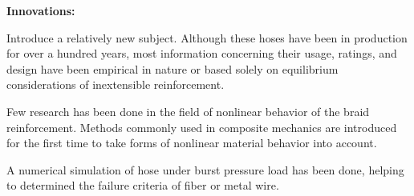 \begin{englishabstract}
\textbf{Innovations:}
\begin{compactenum}
	\item Introduce a relatively new subject. Although these hoses have been in production for over a hundred years, most information concerning their usage, ratings, and design have been empirical in nature or based solely on equilibrium considerations of inextensible reinforcement.
	\item Few research has been done in the field of nonlinear behavior of the braid reinforcement. Methods commonly used in composite mechanics are introduced for the first time to take  forms of nonlinear material behavior into account.
	\item A numerical simulation of hose under burst pressure load has been done,  helping to determined the failure criteria of fiber or metal wire.



\end{compactenum}



  
  
\end{englishabstract}
